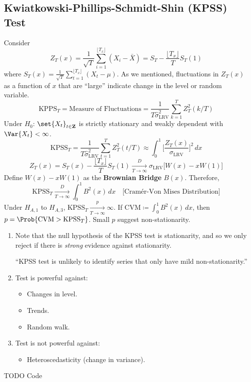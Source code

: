 \subsection*{Kwiatkowski-Phillips-Schmidt-Shin (KPSS) Test}
Consider
\[ Z_T(x)=\frac{1}{\sqrt{T}} \sum_{i=1}^{\lfloor T_x \rfloor} (X_i-\bar{X})=S_T-\frac{\lfloor T_x\rfloor}{T}S_T(1)  \]
where $ S_T(x)=\frac{1}{\sqrt{T}} \sum_{t=1}^{\lfloor T_x\rfloor} (X_t-\mu) $. As we mentioned,
fluctuations in $ Z_T(x) $ as a function of $ x $ that are ``large'' indicate change in the
level or random variable.
\[ \text{KPPS}_T=\text{Measure of Fluctuations}=\frac{1}{T\hat{\sigma}^2_{\text{LRV}}}\sum_{k=1}^{T} Z_T^2(k/T)  \]
Under $ H_0 $: $ \set{X_t}_{t\in\mathbf{Z}} $ is strictly stationary and weakly dependent
with $ \Var{X_t}<\infty $.
\[ \text{KPSS}_T=\frac{1}{T\hat{\sigma}_{\text{LRV}}^2}\sum_{t=1}^{T} Z_T^2(t/T)\approx
    \int_{0}^1 \biggl[\frac{Z_T(x)}{\sigma_{\text{LRV}}}\biggr]^{2}\, dx   \]
\[ Z_T(x)=S_T(x)-\frac{\lfloor T_x\rfloor}{T}S_T(1)\xrightarrow[T\to\infty]{D}
    \sigma_{\text{LRV}}\bigl[W(x)-x W(1)\bigr]  \]
Define $ W(x)-x W(1) $ as the \textbf{Brownian Bridge} $ B(x) $. Therefore,
\[ \text{KPSS}_T\xrightarrow[T\to\infty]{D}\int_0^1 B^2(x)\, dx\quad\text{[Cramér-Von Mises Distribution]} \]
Under $ H_{A,1} $ to $ H_{A,3} $, $ \text{KPSS}_T\xrightarrow[T\to\infty]{p}\infty $. If
$ \text{CVM}\coloneq \int_{0}^{1} B^2(x)\, d{x} $,
then $ p=\Prob{\text{CVM}>\text{KPSS}_T} $. Small $ p $ suggest non-stationarity.
\begin{Remark}{}{}
    \begin{enumerate}[(1)]
        \item Note that the null hypothesis of the KPSS test is stationarity, and so we only
              reject if there is \emph{strong} evidence against stationarity.

              ``KPSS test is unlikely to identify series that only have mild non-stationarity.''
        \item Test is powerful against:
              \begin{itemize}
                  \item Changes in level.
                  \item Trends.
                  \item Random walk.
              \end{itemize}
        \item Test is not powerful against:
              \begin{itemize}
                  \item Heteroscedasticity (change in variance).
              \end{itemize}
    \end{enumerate}
\end{Remark}
TODO Code
